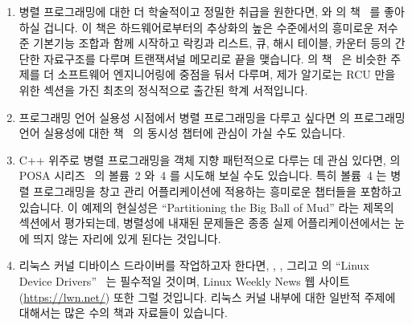 \begin{enumerate}
\item	병렬 프로그래밍에 대한 더 학술적이고 정밀한 취급을 원한다면,
	 와  의
	책~\cite{HerlihyShavit2008Textbook,HerlihyShavit2020Textbook}
	를 좋아하실 겁니다.
	이 책은 하드웨어로부터의 추상화의 높은 수준에서의 흥미로운 저수준
	기본기능 조합과 함께 시작하고 락킹과 리스트, 큐, 해시 테이블, 카운터
	등의 간단한 자료구조를 다루며 트랜잭셔널 메모리로 끝을 맺습니다.
	 의 책~\cite{MichaelScott2013Textbook} 은 비슷한
	주제를 더 소프트웨어 엔지니어링에 중점을 둬서 다루며, 제가 알기로는 RCU
	만을 위한 섹션을 가진 최초의 정식적으로 출간된 학계 서적입니다.
\item	프로그래밍 언어 실용성 시점에서 병렬 프로그래밍을 다루고 싶다면
	 의 프로그래밍 언어 실용성에 대한
	책~\cite{MichaelScott2006Textbook,MichaelScott2015Textbook} 의 동시성
	챕터에 관심이 가실 수도 있습니다.

\iffalse

\item	If you prefer a more academic and rigorous treatment of
	parallel programming,
	you might like \pplsur{Maurice P.}{Herlihy}'s and \pplsur{Nir}{Shavit}'s
	textbook~\cite{HerlihyShavit2008Textbook,HerlihyShavit2020Textbook}.
	This book starts with an interesting combination
	of low-level primitives at high levels of abstraction
	from the hardware, and works its way through locking
	and simple data structures including lists, queues,
	hash tables, and counters, culminating with transactional
	memory.
	\ppl{Michael}{Scott}'s textbook~\cite{MichaelScott2013Textbook}
	approaches similar material with more of a
	software-engineering focus, and, as far as I know, is
	the first formally published academic textbook with
	section devoted to RCU\@.
\item	If you would like an academic treatment of parallel
	programming from a programming\-/language\-/pragmatics viewpoint,
	you might be interested in the concurrency chapter from
	\pplsur{Michael}{Scott}'s
	textbook~\cite{MichaelScott2006Textbook,MichaelScott2015Textbook}
	on programming-language pragmatics.

\fi

\item	C++ 위주로 병렬 프로그래밍을 객체 지향 패턴적으로 다루는 데 관심 있다면,
	 의 POSA
	시리즈~\cite{SchmidtStalRohnertBuschmann2000v2Textbook,
	BuschmannHenneySchmidt2007v4Textbook} 의 볼륨~2 와~4 를 시도해 보실
	수도 있습니다.
	특히 볼륨~4 는 병렬 프로그래밍을 창고 관리 어플리케이션에 적용하는
	흥미로운 챕터들을 포함하고 있습니다.
	이 예제의 현실성은 ``Partitioning the Big Ball of Mud'' 라는 제목의
	섹션에서 평가되는데, 병렬성에 내재된 문제들은 종종 실제
	어플리케이션에서는 눈에 띄지 않는 자리에 있게 된다는 것입니다.
\item	리눅스 커널 디바이스 드라이버를 작업하고자 한다면,
	, ,
	그리고  의
	``Linux Device Drivers''~\cite{CorbetRubiniKroahHartman}
	는 필수적일 것이며, Linux Weekly News 웹 사이트
	(\url{https://lwn.net/}) 또한 그럴 것입니다.
	리눅스 커널 내부에 대한 일반적 주제에 대해서는 많은 수의 책과 자료들이
	있습니다.


\end{enumerate}
